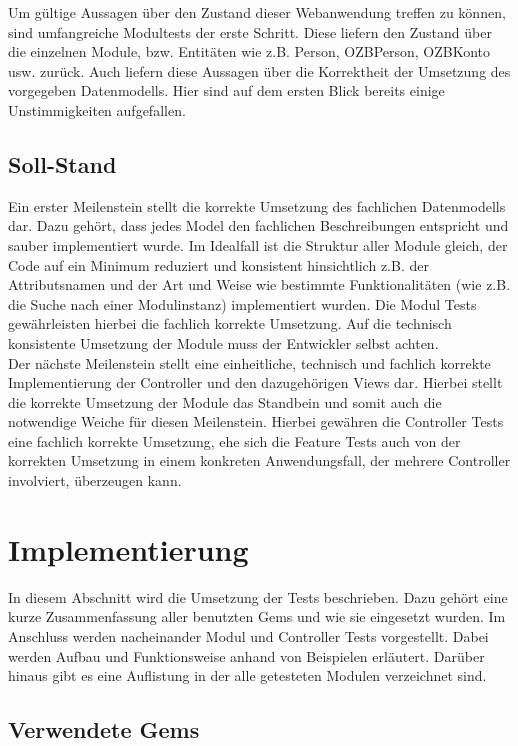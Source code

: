 \documentclass[12pt,             %
               a4paper,          %
               listof=totoc,     %
               index=totoc,      %
               bibliography=totoc,%
               oneside,         %
               BCOR1cm,          %
               english   %
               ]{scrbook}
\begin{document}
Um gültige Aussagen über den Zustand dieser Webanwendung treffen zu können, sind umfangreiche Modultests der erste Schritt. Diese liefern den Zustand über die einzelnen Module, bzw. Entitäten wie z.B. Person, OZBPerson, OZBKonto usw. zurück. Auch liefern diese Aussagen über die Korrektheit der Umsetzung des vorgegeben Datenmodells. Hier sind auf dem ersten Blick bereits einige Unstimmigkeiten aufgefallen.\\

\subsection{Soll-Stand} 
Ein erster Meilenstein stellt die korrekte Umsetzung des fachlichen Datenmodells dar. Dazu gehört, dass jedes Model den fachlichen Beschreibungen entspricht und sauber implementiert wurde. Im Idealfall ist die Struktur aller Module gleich, der Code auf ein Minimum reduziert und konsistent hinsichtlich z.B. der Attributsnamen und der Art und Weise wie bestimmte Funktionalitäten (wie z.B. die Suche nach einer Modulinstanz) implementiert wurden. Die Modul Tests gewährleisten hierbei die fachlich korrekte Umsetzung. Auf die technisch konsistente Umsetzung der Module muss der Entwickler selbst achten.\\
Der nächste Meilenstein stellt eine einheitliche, technisch und fachlich korrekte Implementierung der Controller und den dazugehörigen Views dar. Hierbei stellt die korrekte Umsetzung der Module das Standbein und somit auch die notwendige Weiche für diesen Meilenstein. Hierbei gewähren die Controller Tests eine fachlich korrekte Umsetzung, ehe sich die Feature Tests auch von der korrekten Umsetzung in einem konkreten Anwendungsfall, der mehrere Controller involviert, überzeugen kann.

\section{Implementierung}
In diesem Abschnitt wird die Umsetzung der Tests beschrieben. Dazu gehört eine kurze Zusammenfassung aller benutzten Gems und wie sie eingesetzt wurden. Im Anschluss werden nacheinander Modul und Controller Tests vorgestellt. Dabei werden Aufbau und Funktionsweise anhand von Beispielen erläutert. Darüber hinaus gibt es eine Auflistung in der alle getesteten Modulen verzeichnet sind.
\subsection{Verwendete Gems}
\end{document}
